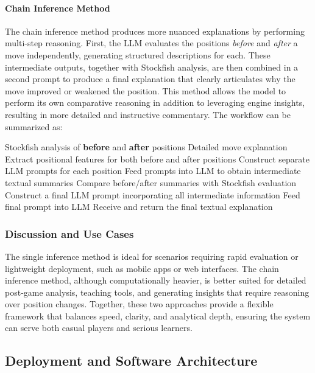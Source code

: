 \documentclass[sigconf,nonacm]{acmart}
\begin{document}
\paragraph{Chain Inference Method} The chain inference method produces more nuanced explanations by performing multi-step reasoning. First, the LLM evaluates the positions \emph{before} and \emph{after} a move independently, generating structured descriptions for each. These intermediate outputs, together with Stockfish analysis, are then combined in a second prompt to produce a final explanation that clearly articulates why the move improved or weakened the position. This method allows the model to perform its own comparative reasoning in addition to leveraging engine insights, resulting in more detailed and instructive commentary. The workflow can be summarized as:

\begin{algorithm}[H]
\caption{Chain Inference Method (Abstract)}
\begin{algorithmic}[1]
\Require Stockfish analysis of \textbf{before} and \textbf{after} positions
\Ensure Detailed move explanation
\State Extract positional features for both before and after positions
\State Construct separate LLM prompts for each position
\State Feed prompts into LLM to obtain intermediate textual summaries
\State Compare before/after summaries with Stockfish evaluation
\State Construct a final LLM prompt incorporating all intermediate information
\State Feed final prompt into LLM
\State Receive and return the final textual explanation
\end{algorithmic}
\end{algorithm}

\subsubsection{Discussion and Use Cases}

The single inference method is ideal for scenarios requiring rapid evaluation or lightweight deployment, such as mobile apps or web interfaces. The chain inference method, although computationally heavier, is better suited for detailed post-game analysis, teaching tools, and generating insights that require reasoning over position changes. Together, these two approaches provide a flexible framework that balances speed, clarity, and analytical depth, ensuring the system can serve both casual players and serious learners.


\subsection{Deployment and Software Architecture}
\end{document}
